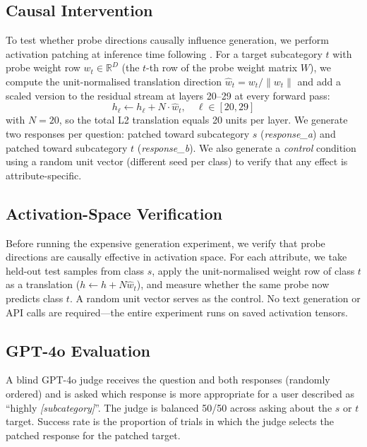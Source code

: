 \documentclass[11pt]{article}
\begin{document}
\subsection{Causal Intervention}

To test whether probe directions causally influence generation, we perform
activation patching at inference time following \citet{chen2024probing}.
For a target subcategory $t$ with probe weight row $w_t \in \mathbb{R}^D$
(the $t$-th row of the probe weight matrix $W$), we compute the unit-normalised
translation direction $\hat{w}_t = w_t / \|w_t\|$ and add a scaled version
to the residual stream at layers 20--29 at every forward pass:
\[
  h_\ell \leftarrow h_\ell + N \cdot \hat{w}_t, \quad \ell \in [20, 29]
\]
with $N = 20$, so the total L2 translation equals 20 units per layer.
We generate two responses per question: patched toward subcategory $s$
(\textit{response\_a}) and patched toward subcategory $t$ (\textit{response\_b}).
We also generate a \textit{control} condition using a random unit vector
(different seed per class) to verify that any effect is attribute-specific.

\subsection{Activation-Space Verification}

Before running the expensive generation experiment, we verify that probe
directions are causally effective in activation space.
For each attribute, we take held-out test samples from class $s$, apply the
unit-normalised weight row of class $t$ as a translation
($h \leftarrow h + N\hat{w}_t$), and measure whether the same probe now
predicts class $t$.  A random unit vector serves as the control.  No text
generation or API calls are required—the entire experiment runs on saved
activation tensors.

\subsection{GPT-4o Evaluation}

A blind GPT-4o judge receives the question and both responses (randomly
ordered) and is asked which response is more appropriate for a user described
as ``highly \textit{[subcategory]}''.  The judge is balanced 50/50 across
asking about the $s$ or $t$ target.  Success rate is the proportion of trials
in which the judge selects the patched response for the patched target.

\end{document}
